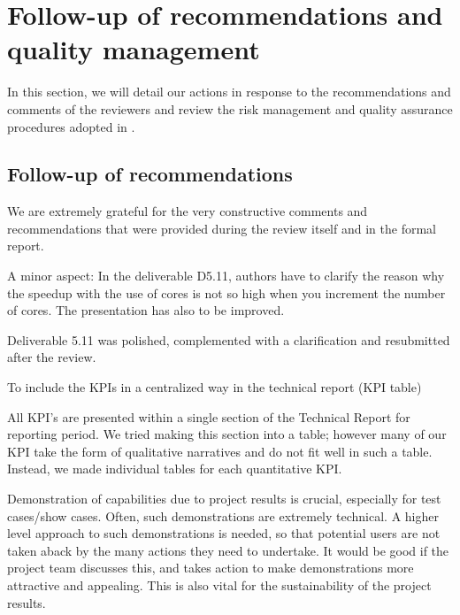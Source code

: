 \section{Follow-up of recommendations and quality management}

In this section, we will detail our actions in response to the recommendations and
comments of the reviewers and review the risk management and quality assurance procedures
adopted in \pn.

\subsection{Follow-up of recommendations}

We are extremely grateful for the very constructive comments and
recommendations that were provided during the review itself and in the
formal report.

\begin{recommendation}
  A minor aspect: In the deliverable D5.11, authors have to clarify
  the reason why the speedup with the use of cores is not so high when
  you increment the number of cores. The presentation has also to be
  improved.
\end{recommendation}

Deliverable 5.11 was polished, complemented with a clarification and
resubmitted after the review.

\begin{recommendation}
  To include the KPIs in a centralized way in the technical report (KPI table)
\end{recommendation}

All KPI's are presented within a single section of the Technical
Report for reporting period. We tried making this section into a
table; however many of our KPI take the form of qualitative narratives
and do not fit well in such a table. Instead, we made individual
tables for each quantitative KPI.

\begin{recommendation}
  Demonstration of capabilities due to project results is crucial,
  especially for test cases/show cases. Often, such demonstrations are
  extremely technical. A higher level approach to such demonstrations
  is needed, so that potential users are not taken aback by the many
  actions they need to undertake. It would be good if the project team
  discusses this, and takes action to make demonstrations more
  attractive and appealing. This is also vital for the sustainability
  of the project results.
\end{recommendation}

